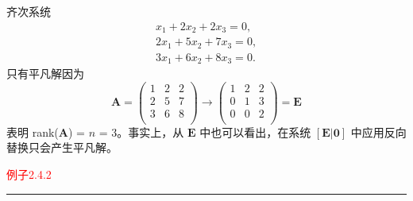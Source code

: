 齐次系统
\[
\begin{aligned} 
    x_1 + 2x_2 + 2x_3 = 0, \\
    2x_1 + 5x_2 + 7x_3 = 0, \\
    3x_1 + 6x_2 + 8x_3 = 0.
\end{aligned}
\]
只有平凡解因为
\[
\mathbf{A} = 
\left(\begin{array}{ccc}
    1 & 2 & 2 \\
    2 & 5 & 7 \\
    3 & 6 & 8 \\
\end{array}\right)\to
\left(\begin{array}{cccc}
    1 & 2 & 2 \\
    0 & 1 & 3 \\
    0 & 0 & 2 \\
\end{array}\right) = \mathbf{E}
\]
表明 rank(\(\mathbf{A}\)) = \(n\) = 3。事实上，从 \(\mathbf{E}\) 中也可以看出，在系统 \([\mathbf{E|0}]\) 中应用反向替换只会产生平凡解。

\textcolor{red}{例子2.4.2}
\color{red}\rule{\textwidth}{0.4pt}\color{black}

